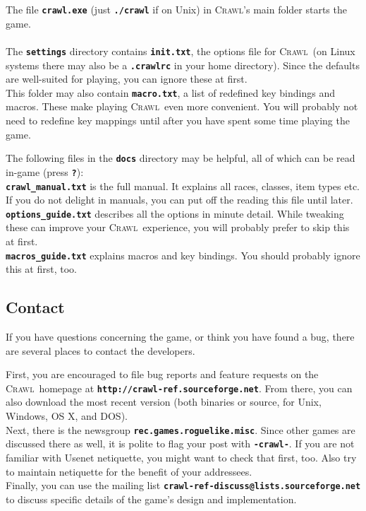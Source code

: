 \documentclass[a4paper,10pt]{article}
\newcommand{\key}[1]{{{\texttt{\textbf{#1}}}}} %
\newcommand{\crawl}{\textsc{Crawl}}
\newcommand{\spacecolumn}{\begin{minipage}[t]{2cm}\phantom{xxxx}\end{minipage}}
\begin{document}
\begin{minipage}[t]{7cm}
The file \key{crawl.exe} (just \key{./crawl} if on Unix) in \crawl's main 
folder starts the game.
\\ \\
The \key{settings} directory contains \key{init.txt}, the options file for
\crawl\ (on Linux systems there may also be a \key{.crawlrc} in your home
directory). Since the defaults are well-suited for playing, you can ignore
these at first.
\\
This folder may also contain \key{macro.txt}, a list of redefined key 
bindings and macros. These make playing \crawl\ even more convenient. 
You will probably not need to redefine key mappings until after you have
spent some time playing the game.
\end{minipage}
%
\spacecolumn
%
\begin{minipage}[t]{7cm}
The following files in the \key{docs} directory may be helpful, all of
which can be read in-game (press \key{?}):
\\
\key{crawl\_manual.txt} is the full manual. It explains all races, classes, 
item types etc. If you do not delight in manuals, you can put off the 
reading this file until later.
\\
\key{options\_guide.txt} describes all the options in minute detail. While
tweaking these can improve your \crawl\ experience, you will probably prefer
to skip this at first.
\\
\key{macros\_guide.txt} explains macros and key bindings. You should probably
ignore this at first, too.
\end{minipage}

\subsection*{Contact}
	    
If you have questions concerning the game, or think you have found a bug, 
there are several places to contact the developers. 

First, you are encouraged to file bug reports and feature requests on the 
\crawl\ homepage at \key{http://crawl-ref.sourceforge.net}. From there, you 
can also download the most recent version (both binaries or source, for 
Unix, Windows, OS X, and DOS).
\\
Next, there is the newsgroup \key{rec.games.roguelike.misc}. Since other 
games are discussed there as well, it is polite to flag your post with 
\key{-crawl-}. If you are not familiar with Usenet netiquette, you might 
want to check that first, too. Also try to maintain netiquette for the 
benefit of your addressees.
\\
Finally, you can use the mailing list 
\key{crawl-ref-discuss@lists.sourceforge.net}
to discuss specific details of the game's design and implementation.
\end{document}
